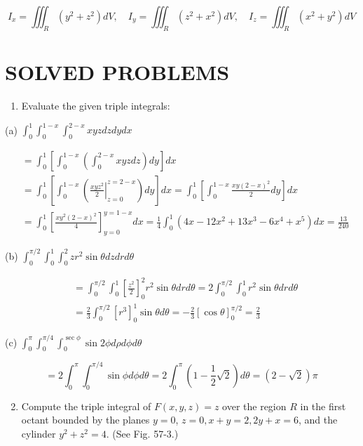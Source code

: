 \documentclass[10pt]{article}
\begin{document}
$$
I_{x}=\iiint_{R}\left(y^{2}+z^{2}\right) d V, \quad I_{y}=\iiint_{R}\left(z^{2}+x^{2}\right) d V, \quad I_{z}=\iiint_{R}\left(x^{2}+y^{2}\right) d V
$$

\section*{SOLVED PROBLEMS}
\begin{enumerate}
  \item Evaluate the given triple integrals:
\end{enumerate}

(a) $\int_{0}^{1} \int_{0}^{1-x} \int_{0}^{2-x} x y z d z d y d x$

$$
\begin{aligned}
& =\int_{0}^{1}\left[\int_{0}^{1-x}\left(\int_{0}^{2-x} x y z d z\right) d y\right] d x \\
& =\int_{0}^{1}\left[\int_{0}^{1-x}\left(\left.\frac{x y z^{2}}{2}\right|_{z=0} ^{z=2-x}\right) d y\right] d x=\int_{0}^{1}\left[\int_{0}^{1-x} \frac{x y(2-x)^{2}}{2} d y\right] d x \\
& =\int_{0}^{1}\left[\frac{x y^{2}(2-x)^{2}}{4}\right]_{y=0}^{y=1-x} d x=\frac{1}{4} \int_{0}^{1}\left(4 x-12 x^{2}+13 x^{3}-6 x^{4}+x^{5}\right) d x=\frac{13}{240}
\end{aligned}
$$

(b) $\int_{0}^{\pi / 2} \int_{0}^{1} \int_{0}^{2} z r^{2} \sin \theta d z d r d \theta$

$$
\begin{aligned}
& =\int_{0}^{\pi / 2} \int_{0}^{1}\left[\frac{z^{2}}{2}\right]_{0}^{2} r^{2} \sin \theta d r d \theta=2 \int_{0}^{\pi / 2} \int_{0}^{1} r^{2} \sin \theta d r d \theta \\
& =\frac{2}{3} \int_{0}^{\pi / 2}\left[r^{3}\right]_{0}^{1} \sin \theta d \theta=-\frac{2}{3}[\cos \theta]_{0}^{\pi / 2}=\frac{2}{3}
\end{aligned}
$$

(c) $\int_{0}^{\pi} \int_{0}^{\pi / 4} \int_{0}^{\sec \phi} \sin 2 \phi d \rho d \phi d \theta$

$$
=2 \int_{0}^{\pi} \int_{0}^{\pi / 4} \sin \phi d \phi d \theta=2 \int_{0}^{\pi}\left(1-\frac{1}{2} \sqrt{2}\right) d \theta=(2-\sqrt{2}) \pi
$$

\begin{enumerate}
  \setcounter{enumi}{1}
  \item Compute the triple integral of $F(x, y, z)=z$ over the region $R$ in the first octant bounded by the planes $y=0$, $z=0, x+y=2,2 y+x=6$, and the cylinder $y^{2}+z^{2}=4$. (See Fig. 57-3.)
\end{enumerate}
\end{document}
